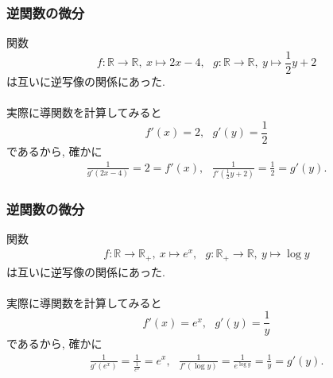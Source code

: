 \documentclass[dvipdfmx,cjk,10.2pt]{beamer}
\newcommand{\R}{\mathbb{R}}
\theoremstyle{definition}
\begin{document}


\begin{frame}
\frametitle{逆関数の微分}


関数
$$
f:\R \longrightarrow \R, \  x \mapsto 2x-4, \ \ \  g:\R \longrightarrow \R, \ y \mapsto \frac{1}{2}y+2
$$
は互いに逆写像の関係にあった. \\
\ \\

実際に導関数を計算してみると
$$
f'(x)=2, \ \ \ g'(y)= \frac{1}{2}
$$
であるから, 確かに
\begin{align*}
 \frac{1}{g'(2x-4)} = 2 = f'(x), \ \ \ \frac{1}{f'(\frac{1}{2}y+2)}=\frac{1}{2}=g'(y). 
\end{align*}



\end{frame}






\begin{frame}
\frametitle{逆関数の微分}


関数
\begin{align*}
f: \R \longrightarrow \R_+, \  x \mapsto e^x, \ \ \ 
g: \R_+ \longrightarrow \R, \ y \mapsto \log y
\end{align*}
は互いに逆写像の関係にあった. \\
\ \\

実際に導関数を計算してみると
$$
f'(x)=e^x, \ \ \ g'(y)= \frac{1}{y}
$$
であるから, 確かに
\begin{align*}
\frac{1}{g'(e^x)} = \frac{1}{\frac{1}{e^x}}=e^x, \ \ \ \frac{1}{f'(\log y)}=\frac{1}{e^{\log y}}=\frac{1}{y}=g'(y). 
\end{align*}



\end{frame}



\end{document}
